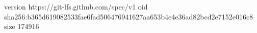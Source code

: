 version https://git-lfs.github.com/spec/v1
oid sha256:b365d619082533fae6fad506476941627aa653b4e4e36ad82bcd2e7152e016c8
size 174916
